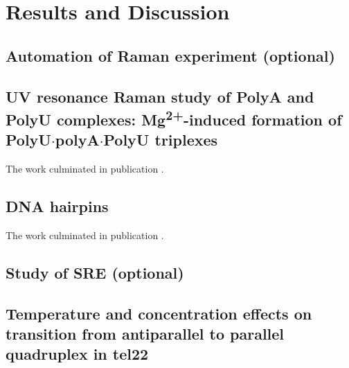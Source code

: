 \chapter{Results and Discussion}





\section{Automation of Raman experiment (optional)}






\section[\texorpdfstring{%
    UV resonance Raman study of PolyA and PolyU complexes:\\
		Mg\textsuperscript{2+}\babelhyphen{nobreak}induced formation of
		PolyU$\cdot$polyA$\cdot$PolyU triplexes
}{%
    UV resonance Raman study of PolyA and PolyU complexes:
		Mg\texttwosuperior\textplussuperior-induced formation of PolyU·polyA·PolyU
		triplexes
}]{%
    UV resonance Raman study of PolyA and PolyU complexes:
		Mg\textsuperscript{2+}-induced formation of PolyU$\cdot$polyA$\cdot$PolyU
		triplexes
}%

The work culminated in publication \textcite{Klener2015}.

\section{DNA hairpins}

The work culminated in publication \textcite{Klener2021}.

\section{Study of SRE (optional)}

\section[Temperature and concentration effects on transition from antiparallel to parallel quadruplex in tel22 (optional)]{Temperature and concentration effects on transition from antiparallel to parallel\\ quadruplex in tel22}
